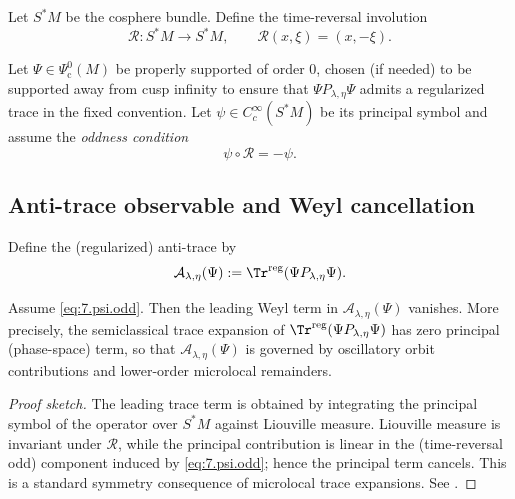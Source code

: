 Let $S^\ast M$ be the cosphere bundle. Define the time-reversal involution
\[
\mathcal R:S^\ast M\to S^\ast M,\qquad \mathcal R(x,\xi)=(x,-\xi).
\]

\begin{definition}\label{def:7.psi.odd}
Let $\Psi\in\Psi^0_{\mathrm{c}}(M)$ be properly supported of order $0$, chosen (if needed) to be supported away from cusp infinity
to ensure that $\Psi P_{\lambda,\eta}\Psi$ admits a regularized trace in the fixed convention.
Let $\psi\in C_c^\infty(S^\ast M)$ be its principal symbol and assume the \emph{oddness condition}
\begin{equation}\label{eq:7.psi.odd}
\psi\circ\mathcal R=-\psi.
\end{equation}
\end{definition}

\subsection{Anti-trace observable and Weyl cancellation}\label{subsec:ch7-antitrace-def}

\begin{definition}\label{def:7.antitrace}
Define the (regularized) anti-trace by
\begin{equation}\label{eq:7.antitrace.def}
\mathcal A_{\lambda,\eta}(\Psi):=\Tr^{\mathrm{reg}}(\Psi P_{\lambda,\eta}\Psi).
\end{equation}
\end{definition}

\begin{lemma}\label{lem:7.weyl.cancellation}
Assume \eqref{eq:7.psi.odd}. Then the leading Weyl term in $\mathcal A_{\lambda,\eta}(\Psi)$ vanishes.
More precisely, the semiclassical trace expansion of $\Tr^{\mathrm{reg}}(\Psi P_{\lambda,\eta}\Psi)$ has zero principal (phase-space)
term, so that $\mathcal A_{\lambda,\eta}(\Psi)$ is governed by oscillatory orbit contributions and lower-order microlocal remainders.
\end{lemma}

\begin{proof}[Proof sketch]
The leading trace term is obtained by integrating the principal symbol of the operator over $S^\ast M$ against Liouville measure.
Liouville measure is invariant under $\mathcal R$, while the principal contribution is linear in the (time-reversal odd) component induced
by \eqref{eq:7.psi.odd}; hence the principal term cancels. This is a standard symmetry consequence of microlocal trace expansions.
See \cite{DuistermaatGuillemin1975,Hormander1983,Sogge2014}.
\end{proof}

